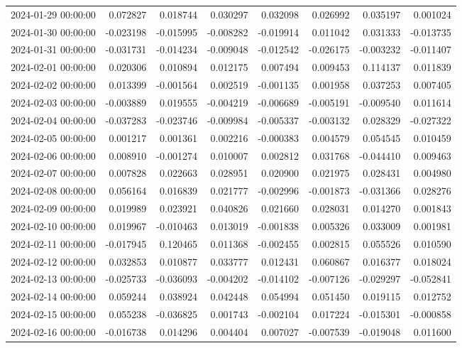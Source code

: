 \begin{tabular}{lrrrrrrr}
2024-01-29 00:00:00 & 0.072827 & 0.018744 & 0.030297 & 0.032098 & 0.026992 & 0.035197 & 0.001024 \\
2024-01-30 00:00:00 & -0.023198 & -0.015995 & -0.008282 & -0.019914 & 0.011042 & 0.031333 & -0.013735 \\
2024-01-31 00:00:00 & -0.031731 & -0.014234 & -0.009048 & -0.012542 & -0.026175 & -0.003232 & -0.011407 \\
2024-02-01 00:00:00 & 0.020306 & 0.010894 & 0.012175 & 0.007494 & 0.009453 & 0.114137 & 0.011839 \\
2024-02-02 00:00:00 & 0.013399 & -0.001564 & 0.002519 & -0.001135 & 0.001958 & 0.037253 & 0.007405 \\
2024-02-03 00:00:00 & -0.003889 & 0.019555 & -0.004219 & -0.006689 & -0.005191 & -0.009540 & 0.011614 \\
2024-02-04 00:00:00 & -0.037283 & -0.023746 & -0.009984 & -0.005337 & -0.003132 & 0.028329 & -0.027322 \\
2024-02-05 00:00:00 & 0.001217 & 0.001361 & 0.002216 & -0.000383 & 0.004579 & 0.054545 & 0.010459 \\
2024-02-06 00:00:00 & 0.008910 & -0.001274 & 0.010007 & 0.002812 & 0.031768 & -0.044410 & 0.009463 \\
2024-02-07 00:00:00 & 0.007828 & 0.022663 & 0.028951 & 0.020900 & 0.021975 & 0.028431 & 0.004980 \\
2024-02-08 00:00:00 & 0.056164 & 0.016839 & 0.021777 & -0.002996 & -0.001873 & -0.031366 & 0.028276 \\
2024-02-09 00:00:00 & 0.019989 & 0.023921 & 0.040826 & 0.021660 & 0.028031 & 0.014270 & 0.001843 \\
2024-02-10 00:00:00 & 0.019967 & -0.010463 & 0.013019 & -0.001838 & 0.005326 & 0.033009 & 0.001981 \\
2024-02-11 00:00:00 & -0.017945 & 0.120465 & 0.011368 & -0.002455 & 0.002815 & 0.055526 & 0.010590 \\
2024-02-12 00:00:00 & 0.032853 & 0.010877 & 0.033777 & 0.012431 & 0.060867 & 0.016377 & 0.018024 \\
2024-02-13 00:00:00 & -0.025733 & -0.036093 & -0.004202 & -0.014102 & -0.007126 & -0.029297 & -0.052841 \\
2024-02-14 00:00:00 & 0.059244 & 0.038924 & 0.042448 & 0.054994 & 0.051450 & 0.019115 & 0.012752 \\
2024-02-15 00:00:00 & 0.055238 & -0.036825 & 0.001743 & -0.002104 & 0.017224 & -0.015301 & -0.000858 \\
2024-02-16 00:00:00 & -0.016738 & 0.014296 & 0.004404 & 0.007027 & -0.007539 & -0.019048 & 0.011600 \\

\end{tabular}
